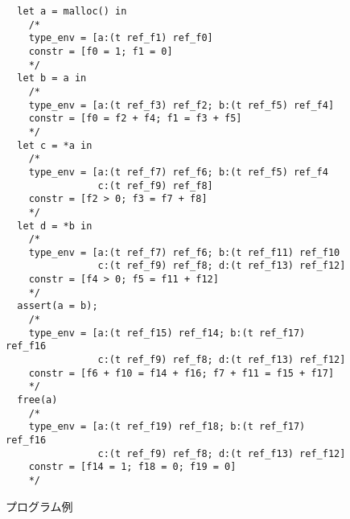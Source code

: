 \begin{figure}[htbp]
  \small
\begin{verbatim}
  let a = malloc() in
    /*
    type_env = [a:(t ref_f1) ref_f0]
    constr = [f0 = 1; f1 = 0]
    */
  let b = a in
    /*
    type_env = [a:(t ref_f3) ref_f2; b:(t ref_f5) ref_f4]
    constr = [f0 = f2 + f4; f1 = f3 + f5]
    */
  let c = *a in
    /*
    type_env = [a:(t ref_f7) ref_f6; b:(t ref_f5) ref_f4
                c:(t ref_f9) ref_f8]
    constr = [f2 > 0; f3 = f7 + f8]
    */
  let d = *b in
    /*
    type_env = [a:(t ref_f7) ref_f6; b:(t ref_f11) ref_f10
                c:(t ref_f9) ref_f8; d:(t ref_f13) ref_f12]
    constr = [f4 > 0; f5 = f11 + f12]
    */
  assert(a = b);
    /*
    type_env = [a:(t ref_f15) ref_f14; b:(t ref_f17) ref_f16
                c:(t ref_f9) ref_f8; d:(t ref_f13) ref_f12]
    constr = [f6 + f10 = f14 + f16; f7 + f11 = f15 + f17]
    */
  free(a)
    /*
    type_env = [a:(t ref_f19) ref_f18; b:(t ref_f17) ref_f16
                c:(t ref_f9) ref_f8; d:(t ref_f13) ref_f12]
    constr = [f14 = 1; f18 = 0; f19 = 0]
    */
\end{verbatim}
  \caption{プログラム例}
  \label{typing_example}
\end{figure}
